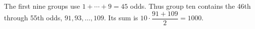 The first nine groups use $1+\cdots+9=45$ odds. Thus group ten contains the 46th through 55th odds, $91,93,\ldots,109$. Its sum is $10\cdot\dfrac{91+109}{2}=\boxed{1000}$.
